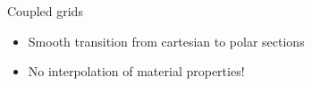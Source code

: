 %
%
%
%
%

\begin{frame}{Coupled grids}
  \begin{itemize}
  \item Smooth transition from cartesian to polar sections
  \item No interpolation of material properties!
  \end{itemize}
  \vfill
  \centering
\end{frame}

